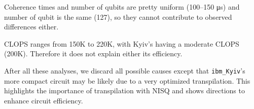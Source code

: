 \documentclass[conference,twoside]{IEEEtran}
\begin{document}
Coherence times and number of qubits are pretty uniform (100--150 \si{\micro\second}) and number of qubit is the same (127), so they cannot contribute to observed differences either.

CLOPS ranges from 150K to 220K, with Kyiv's having a moderate CLOPS (200K). Therefore it does not explain either its efficiency.

After all these analyses, we discard all possible causes except that \texttt{ibm\_Kyiv}'s more compact circuit may be likely due to a very optimized transpilation. This highlights the importance of transpilation with NISQ and shows directions to  enhance circuit efficiency.

\begin{table}[h]
\centering
\caption{Comparison of Circuit Parameters Across Different QPUs For $N=51$, and $a=4$}
\label{Kyiv_reincarnation}
\end{table}
\end{document}
